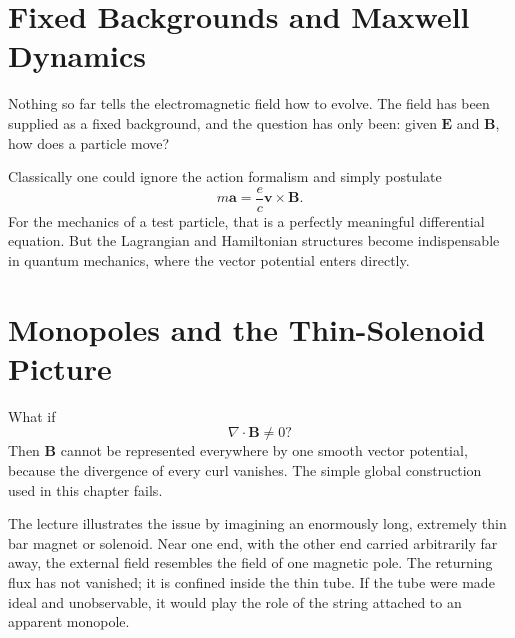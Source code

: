 \section{Fixed Backgrounds and Maxwell Dynamics}

Nothing so far tells the electromagnetic field how to evolve. The field has been supplied as a fixed background, and the question has only been: given \(\mathbf E\) and \(\mathbf B\), how does a particle move?

\begin{classroomqa}
\end{classroomqa}

Classically one could ignore the action formalism and simply postulate
\begin{equation}
  m\mathbf a=\frac{e}{c}\mathbf v\times\mathbf B.
\end{equation}
For the mechanics of a test particle, that is a perfectly meaningful differential equation. But the Lagrangian and Hamiltonian structures become indispensable in quantum mechanics, where the vector potential enters directly.

\section{Monopoles and the Thin-Solenoid Picture}

What if
\begin{equation}
  \nabla\cdot\mathbf B\neq0?
\end{equation}
Then \(\mathbf B\) cannot be represented everywhere by one smooth vector potential, because the divergence of every curl vanishes. The simple global construction used in this chapter fails.

The lecture illustrates the issue by imagining an enormously long, extremely thin bar magnet or solenoid. Near one end, with the other end carried arbitrarily far away, the external field resembles the field of one magnetic pole. The returning flux has not vanished; it is confined inside the thin tube. If the tube were made ideal and unobservable, it would play the role of the string attached to an apparent monopole.

